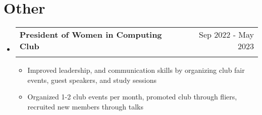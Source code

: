 \documentclass[letterpaper,11pt]{article}
\makeatletter
\newcommand{\resumeItem}[1]{
  \item\small{
    {#1 \vspace{-2pt}}
  }
}
\newcommand{\resumeSubheading}[4]{
  \vspace{-2pt}\item
    \begin{tabular*}{0.97\textwidth}[t]{l@{\extracolsep{\fill}}r}
      \textbf{#1} & #2 \\
      \textit{\small#3} & \textit{\small #4} \\
    \end{tabular*}\vspace{-7pt}
}
\newcommand{\resumeSubHeadingListStart}{\begin{itemize}[leftmargin=0.15in, label={}]}
\newcommand{\resumeSubHeadingListEnd}{\end{itemize}}
\newcommand{\resumeItemListStart}{\begin{itemize}}
\newcommand{\resumeItemListEnd}{\end{itemize}\vspace{-5pt}}
\makeatother
\begin{document}
  
 \section{Other}
    \resumeSubHeadingListStart

    \resumeSubheading
      {President of Women in Computing Club}{Sep 2022 - May 2023}
       {}{}
      \resumeItemListStart
        \vspace{-4mm}
        \resumeItem{Improved leadership, and communication skills by organizing club fair events, guest speakers, and study sessions}
        \resumeItem{Organized 1-2 club events per month, promoted club through fliers, recruited new members through talks}
        \resumeItemListEnd
    \resumeSubHeadingListEnd
\end{document}
